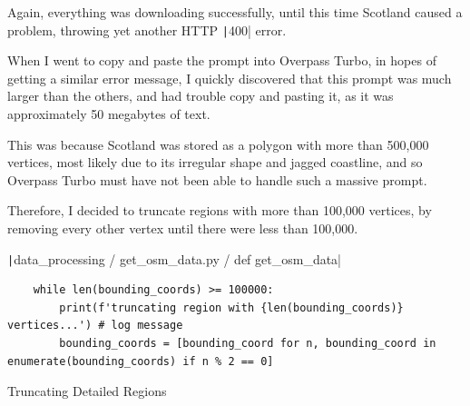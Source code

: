 \documentclass[12pt]{report}
\newcommand{\pil}[1]{\protect\texttt|#1|}
\begin{document}
\begin{center}
\end{center}

Again, everything was downloading successfully, until this time Scotland caused a problem, throwing yet another HTTP \pil{400} error.

When I went to copy and paste the prompt into Overpass Turbo, in hopes of getting a similar error message, I quickly discovered that this prompt was much larger than the others, and had trouble copy and pasting it, as it was approximately 50 megabytes of text.

This was because Scotland was stored as a polygon with more than 500,000 vertices, most likely due to its irregular shape and jagged coastline, and so Overpass Turbo must have not been able to handle such a massive prompt.

Therefore, I decided to truncate regions with more than 100,000 vertices, by removing every other vertex until there were less than 100,000.

\begin{listing}[H]
\pil{data_processing / get_osm_data.py / def get_osm_data}
\begin{verbatim}
    while len(bounding_coords) >= 100000:
        print(f'truncating region with {len(bounding_coords)} vertices...') # log message
        bounding_coords = [bounding_coord for n, bounding_coord in enumerate(bounding_coords) if n % 2 == 0]
\end{verbatim}
\caption{Truncating Detailed Regions}\label{cs:truncatingRegions}
\end{listing}

\begin{center}
\end{center}
\end{document}
